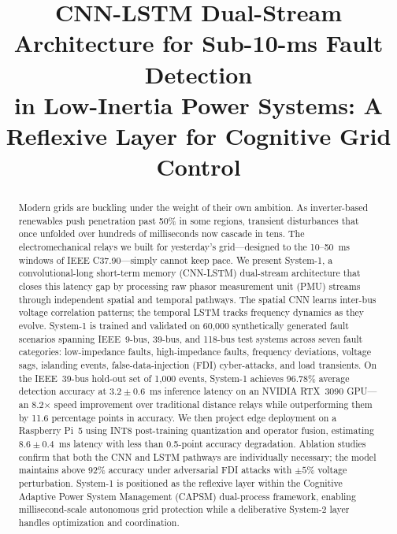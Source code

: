 \documentclass[journal]{IEEEtran}
\begin{document}
\title{CNN-LSTM Dual-Stream Architecture for Sub-10-ms Fault Detection\\ in Low-Inertia Power Systems: A Reflexive Layer for Cognitive Grid Control}

\author{
}


\maketitle

\begin{abstract}
Modern grids are buckling under the weight of their own ambition. As inverter-based renewables push penetration past 50\% in some regions, transient disturbances that once unfolded over hundreds of milliseconds now cascade in tens. The electromechanical relays we built for yesterday's grid---designed to the 10--50~ms windows of IEEE C37.90---simply cannot keep pace. We present System-1, a convolutional-long short-term memory (CNN-LSTM) dual-stream architecture that closes this latency gap by processing raw phasor measurement unit (PMU) streams through independent spatial and temporal pathways. The spatial CNN learns inter-bus voltage correlation patterns; the temporal LSTM tracks frequency dynamics as they evolve. System-1 is trained and validated on 60,000 synthetically generated fault scenarios spanning IEEE~9-bus, 39-bus, and 118-bus test systems across seven fault categories: low-impedance faults, high-impedance faults, frequency deviations, voltage sags, islanding events, false-data-injection (FDI) cyber-attacks, and load transients. On the IEEE~39-bus hold-out set of 1,000 events, System-1 achieves 96.78\% average detection accuracy at $3.2 \pm 0.6$~ms inference latency on an NVIDIA RTX~3090 GPU---an 8.2$\times$ speed improvement over traditional distance relays while outperforming them by 11.6 percentage points in accuracy. We then project edge deployment on a Raspberry Pi~5 using INT8 post-training quantization and operator fusion, estimating $8.6 \pm 0.4$~ms latency with less than 0.5-point accuracy degradation. Ablation studies confirm that both the CNN and LSTM pathways are individually necessary; the model maintains above 92\% accuracy under adversarial FDI attacks with $\pm5\%$ voltage perturbation. System-1 is positioned as the reflexive layer within the Cognitive Adaptive Power System Management (CAPSM) dual-process framework, enabling millisecond-scale autonomous grid protection while a deliberative System-2 layer handles optimization and coordination.
\end{abstract}
\end{document}
